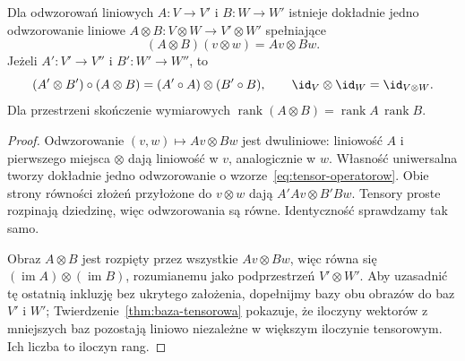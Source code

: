\begin{twierdzenie}
\label{thm:tensor-operatorow}
Dla odwzorowań liniowych $A\colon V\to V'$ i $B\colon W\to W'$
istnieje dokładnie jedno odwzorowanie liniowe
$A\otimes B\colon V\otimes W\to V'\otimes W'$ spełniające
\begin{equation}\label{eq:tensor-operatorow}
 (A\otimes B)(v\otimes w)=Av\otimes Bw.
\end{equation}
Jeżeli $A'\colon V'\to V''$ i $B'\colon W'\to W''$, to
\[
 (A'\otimes B')\circ(A\otimes B)=(A'\circ A)\otimes(B'\circ B),
 \qquad \id_V\otimes\id_W=\id_{V\otimes W}.
\]
Dla przestrzeni skończenie wymiarowych
$\operatorname{rank}(A\otimes B)=\operatorname{rank}A\,\operatorname{rank}B$.
\end{twierdzenie}
\begin{proof}
Odwzorowanie $(v,w)\mapsto Av\otimes Bw$ jest dwuliniowe:
liniowość $A$ i pierwszego miejsca $\otimes$ dają
liniowość w $v$, analogicznie w $w$. Własność uniwersalna
tworzy dokładnie jedno odwzorowanie o wzorze~\eqref{eq:tensor-operatorow}.
Obie strony równości złożeń przyłożone do $v\otimes w$
dają $A'Av\otimes B'Bw$. Tensory proste rozpinają dziedzinę,
więc odwzorowania są równe. Identyczność sprawdzamy tak samo.

Obraz $A\otimes B$ jest rozpięty przez wszystkie $Av\otimes Bw$,
więc równa się $(\operatorname{im}A)\otimes(\operatorname{im}B)$,
rozumianemu jako podprzestrzeń $V'\otimes W'$.
Aby uzasadnić tę ostatnią inkluzję bez ukrytego założenia,
dopełnijmy bazy obu obrazów do baz $V'$ i $W'$;
Twierdzenie~\ref{thm:baza-tensorowa} pokazuje, że iloczyny
wektorów z mniejszych baz pozostają liniowo niezależne
w większym iloczynie tensorowym. Ich liczba to iloczyn rang.
\end{proof}

